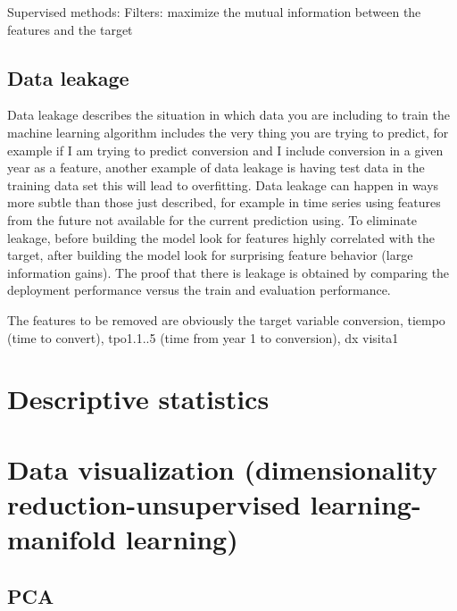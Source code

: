 \documentclass[12pt]{report}
\begin{document}
Supervised methods: Filters: maximize the mutual information between the features and the target

\subsection{Data leakage}
Data leakage describes the situation in which data you are including to train the machine learning algorithm includes the very thing you are trying to predict, for example if I am trying to predict conversion and I include conversion in a given year as a feature, another example of data leakage is having test data in the training data set this will lead to overfitting. Data leakage can happen in ways more subtle than those just described, for example in time series using features from the future not available for the current prediction using. To eliminate leakage, before building the  model look for features highly correlated with the target, after building the model look for surprising feature behavior (large information gains). The proof that there is leakage is obtained by comparing the deployment performance versus the train and evaluation performance. 

The features to be removed are obviously the target variable conversion, tiempo (time to convert), tpo1.1..5 (time from year 1 to conversion), dx visita1

\section{Descriptive statistics}

\section{Data visualization (dimensionality reduction-unsupervised learning-manifold learning)}
\subsection{PCA}
\end{document}
